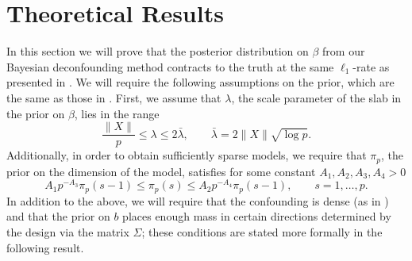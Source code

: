 \documentclass[11pt]{article}
\numberwithin{equation}{section}
\begin{document}
\section{Theoretical Results}\label{sec:theory}
In this section we will prove that the posterior distribution on $\beta$ from our Bayesian deconfounding method contracts to the truth at the same $\ell_1$-rate as presented in \cite{CBM2020}. We will require the following assumptions on the prior, which are the same as those in \cite{CS-HV2015}. First, we assume that $\lambda$, the scale parameter of the slab in the prior on $\beta$, lies in the range
\begin{equation}
	\frac{\|X\|}{p} \leq \lambda \leq 2\bar{\lambda}, \qquad \bar{\lambda} = 2\|X\|\sqrt{\log p}. \label{prior_assum_lambda}
\end{equation}
Additionally, in order to obtain sufficiently sparse models, we require that $\pi_p$, the prior on the dimension of the model, satisfies for some constant $A_1, A_2, A_3, A_4 > 0$
\begin{equation}
	A_1 p^{-A_3}\pi_p(s-1) \leq \pi_p(s) \leq A_2p^{-A_4} \pi_p(s-1), \qquad s = 1,\dots, p. \label{prior_assum_pi_p}
\end{equation}
In addition to the above, we will require that the confounding is dense (as in \citealt{CBM2020}) and that the prior on $b$ places enough mass in certain directions determined by the design via the matrix $\Sigma$; these conditions are stated more formally in the following result.
\end{document}
